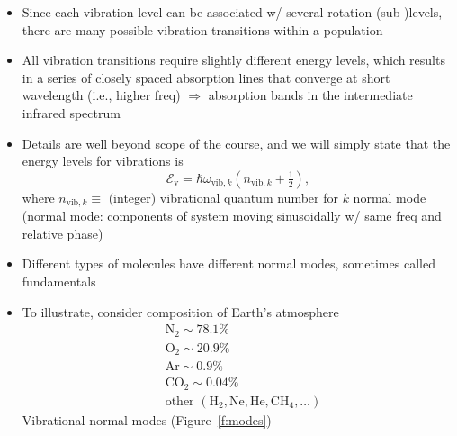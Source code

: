 \documentclass[11pt, oneside]{article}
\begin{document}
\begin{itemize}
	\item[--] Since each vibration level can be associated w/ several rotation (sub-)levels, there are many possible vibration transitions within a population
	\item[--] All vibration transitions require slightly different energy levels, which results in a series of closely spaced absorption lines that converge at short wavelength (i.e., higher freq) $\Rightarrow$ absorption bands in the intermediate infrared spectrum
	\item[--] Details are well beyond scope of the course, and we will simply state that the energy levels for vibrations is
	\begin{equation}
		\label{e:Ev}
		\mathcal{E}_\mathrm{v} = \hbar\omega_{\mathrm{vib},k}\left(n_{\mathrm{vib},k} + \tfrac{1}{2}\right),
	\end{equation}
	where $n_{\mathrm{vib},k} \equiv$ (integer) vibrational quantum number for $k$ normal mode\\
	(normal mode: components of system moving sinusoidally w/ same freq and relative phase)
	\item[--] Different types of molecules have different normal modes, sometimes called fundamentals
	\item[--] To illustrate, consider composition of Earth's atmosphere
	\begin{align*}
		&\mathrm{N_2} \sim 78.1\%\\
		&\mathrm{O_2} \sim 20.9\%\\
		&\mathrm{Ar} \sim 0.9\%\\
		&\mathrm{CO_2} \sim 0.04\%\\
		&\text{other } (\mathrm{H_2}, \mathrm{Ne}, \mathrm{He}, \mathrm{CH_4}, \ldots)
	\end{align*}
	Vibrational normal modes (Figure~\ref{f:modes})
\end{itemize}
\end{document}
